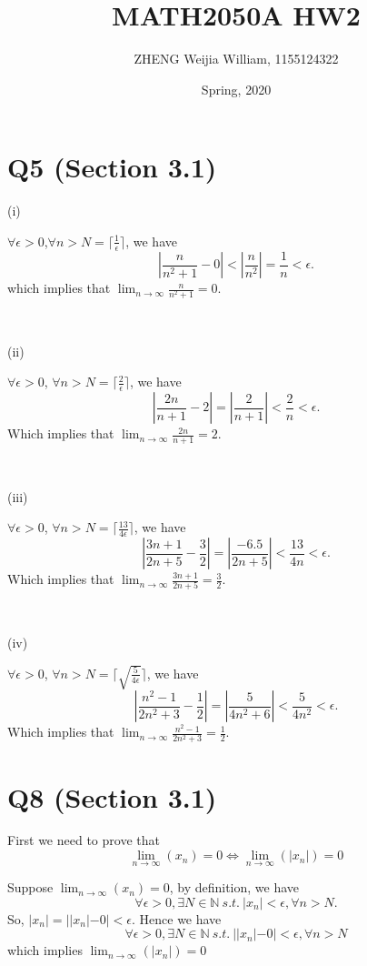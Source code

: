 \documentclass[12pt]{article}%
\begin{document}
\title{MATH2050A HW2}
\author{ZHENG Weijia William, 1155124322}
\date{Spring, 2020}
\maketitle

\section{Q5 (Section 3.1)}

(i) 

$\forall \epsilon>0$,$\forall n>N = \lceil{\frac{1}{\epsilon}}\rceil$, we have $$|\frac{n}{n^2+1}-0|<|\frac{n}{n^2}|=\frac{1}{n}<\epsilon.$$ which implies that $\lim_{n \to \infty} \frac{n}{n^2+1}=0 .$

~\

(ii) 

$\forall \epsilon >0$, $\forall n>N = \lceil{\frac{2}{\epsilon}}\rceil$, we have $$|\frac{2n}{n+1}-2|=|\frac{2}{n+1}|<\frac{2}{n}<\epsilon.$$Which implies that $\lim_{n \to \infty} \frac{2n}{n+1}=2 .$

~\

(iii) 

$\forall \epsilon >0$, $\forall n>N = \lceil{\frac{13}{4\epsilon}}\rceil$, we have $$|\frac{3n+1}{2n+5}-\frac{3}{2}|=|\frac{-6.5}{2n+5}|<\frac{13}{4n}<\epsilon.$$ Which implies that $\lim_{n \to \infty} \frac{3n+1}{2n+5}=\frac{3}{2} .$

~\

(iv) 

$\forall \epsilon >0$, $\forall n>N = \lceil{\sqrt{\frac{5}{4\epsilon}}}\rceil$, we have $$|\frac{n^2-1}{2n^2+3}-\frac{1}{2}|=|\frac{5}{4n^2+6}|<\frac{5}{4n^2}<\epsilon.$$ Which implies that $\lim_{n \to \infty} \frac{n^2-1}{2n^2+3}=\frac{1}{2} .$

\section{Q8 (Section 3.1)}

First we need to prove that $$\lim_{n \to \infty} (x_n) =0 \iff \lim_{n \to \infty} (|x_n|) =0$$

Suppose $\lim_{n \to \infty} (x_n) =0$, by definition, we have $$\forall \epsilon>0, \exists N \in \mathbb{N} ~s.t.~ |x_n|<\epsilon, \forall n>N.$$ So, $|x_n|=||x_n|-0|<\epsilon.$ Hence we have $$\forall \epsilon>0, \exists N \in \mathbb{N} ~s.t.~ ||x_n|-0|<\epsilon, \forall n>N$$ which implies $\lim_{n \to \infty} (|x_n|) =0$
\end{document}
